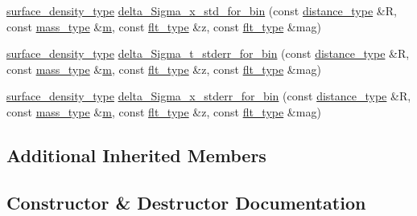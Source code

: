 \begin{DoxyCompactItemize}
\item 
\hyperlink{namespaceIceBRG_a80c597ef5ba0a32491d32a9f0083b02d}{surface\+\_\+density\+\_\+type} \hyperlink{classIceBRG_1_1pair__binner_aaa1bc2defcf7bdfe26179a089565e30c}{delta\+\_\+\+Sigma\+\_\+x\+\_\+std\+\_\+for\+\_\+bin} (const \hyperlink{namespaceIceBRG_a45499647eb87e24c10ab32c628711cec}{distance\+\_\+type} \&R, const \hyperlink{namespaceIceBRG_a1be72ac4918a9b029f2eefa084213e35}{mass\+\_\+type} \&\hyperlink{namespaceIceBRG_ada6365c5d16106f0608afbd34f010bcc}{m}, const \hyperlink{lib_2IceBRG__main_2common_8h_ad0f130a56eeb944d9ef2692ee881ecc4}{flt\+\_\+type} \&z, const \hyperlink{lib_2IceBRG__main_2common_8h_ad0f130a56eeb944d9ef2692ee881ecc4}{flt\+\_\+type} \&mag)
\item 
\hyperlink{namespaceIceBRG_a80c597ef5ba0a32491d32a9f0083b02d}{surface\+\_\+density\+\_\+type} \hyperlink{classIceBRG_1_1pair__binner_a3c32bd86aa89de0ef6ad1fca5097f41c}{delta\+\_\+\+Sigma\+\_\+t\+\_\+stderr\+\_\+for\+\_\+bin} (const \hyperlink{namespaceIceBRG_a45499647eb87e24c10ab32c628711cec}{distance\+\_\+type} \&R, const \hyperlink{namespaceIceBRG_a1be72ac4918a9b029f2eefa084213e35}{mass\+\_\+type} \&\hyperlink{namespaceIceBRG_ada6365c5d16106f0608afbd34f010bcc}{m}, const \hyperlink{lib_2IceBRG__main_2common_8h_ad0f130a56eeb944d9ef2692ee881ecc4}{flt\+\_\+type} \&z, const \hyperlink{lib_2IceBRG__main_2common_8h_ad0f130a56eeb944d9ef2692ee881ecc4}{flt\+\_\+type} \&mag)
\item 
\hyperlink{namespaceIceBRG_a80c597ef5ba0a32491d32a9f0083b02d}{surface\+\_\+density\+\_\+type} \hyperlink{classIceBRG_1_1pair__binner_aacd662f4665abf4678344f14b6e77f35}{delta\+\_\+\+Sigma\+\_\+x\+\_\+stderr\+\_\+for\+\_\+bin} (const \hyperlink{namespaceIceBRG_a45499647eb87e24c10ab32c628711cec}{distance\+\_\+type} \&R, const \hyperlink{namespaceIceBRG_a1be72ac4918a9b029f2eefa084213e35}{mass\+\_\+type} \&\hyperlink{namespaceIceBRG_ada6365c5d16106f0608afbd34f010bcc}{m}, const \hyperlink{lib_2IceBRG__main_2common_8h_ad0f130a56eeb944d9ef2692ee881ecc4}{flt\+\_\+type} \&z, const \hyperlink{lib_2IceBRG__main_2common_8h_ad0f130a56eeb944d9ef2692ee881ecc4}{flt\+\_\+type} \&mag)
\end{DoxyCompactItemize}
\subsection*{Additional Inherited Members}


\subsection{Constructor \& Destructor Documentation}
\hypertarget{classIceBRG_1_1pair__binner_a14fe5215ad45872e549c71ecc4e170e9}{}
